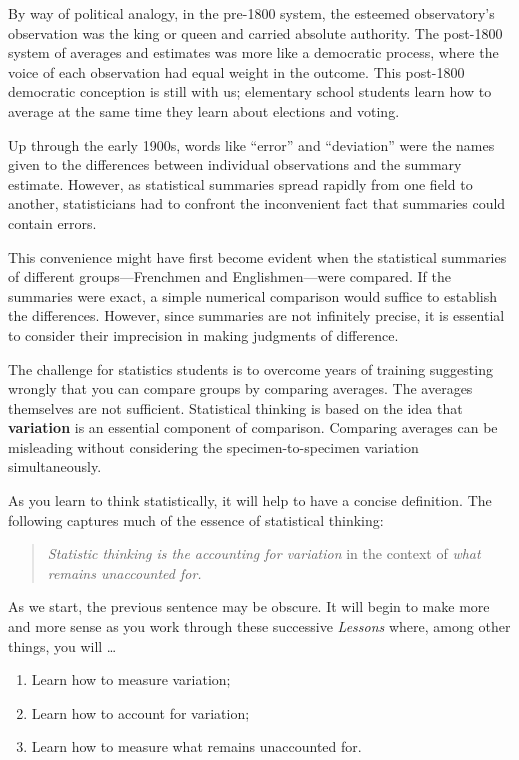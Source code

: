 \documentclass[
  letterpaper,
  DIV=11,
  numbers=noendperiod,
  oneside]{scrartcl}
\providecommand{\tightlist}{%
  \setlength{\itemsep}{0pt}\setlength{\parskip}{0pt}}\usepackage{longtable,booktabs,array}
\begin{document}
By way of political analogy, in the pre-1800 system, the esteemed
observatory's observation was the king or queen and carried absolute
authority. The post-1800 system of averages and estimates was more like
a democratic process, where the voice of each observation had equal
weight in the outcome. This post-1800 democratic conception is still
with us; elementary school students learn how to average at the same
time they learn about elections and voting.

Up through the early 1900s, words like ``error'' and ``deviation'' were
the names given to the differences between individual observations and
the summary estimate. However, as statistical summaries spread rapidly
from one field to another, statisticians had to confront the
inconvenient fact that summaries could contain errors.

This convenience might have first become evident when the statistical
summaries of different groups---Frenchmen and Englishmen---were
compared. If the summaries were exact, a simple numerical comparison
would suffice to establish the differences. However, since summaries are
not infinitely precise, it is essential to consider their imprecision in
making judgments of difference.

The challenge for statistics students is to overcome years of training
suggesting wrongly that you can compare groups by comparing averages.
The averages themselves are not sufficient. Statistical thinking is
based on the idea that \textbf{variation} is an essential component of
comparison. Comparing averages can be misleading without considering the
specimen-to-specimen variation simultaneously.

As you learn to think statistically, it will help to have a concise
definition. The following captures much of the essence of statistical
thinking:

\begin{quote}
\emph{Statistic thinking is the accounting for variation} in the context
of \emph{what remains unaccounted for.}
\end{quote}

As we start, the previous sentence may be obscure. It will begin to make
more and more sense as you work through these successive \emph{Lessons}
where, among other things, you will \ldots{}

\begin{enumerate}
\def\labelenumi{\arabic{enumi}.}
\tightlist
\item
  Learn how to measure variation;
\item
  Learn how to account for variation;
\item
  Learn how to measure what remains unaccounted for.
\end{enumerate}
\end{document}
